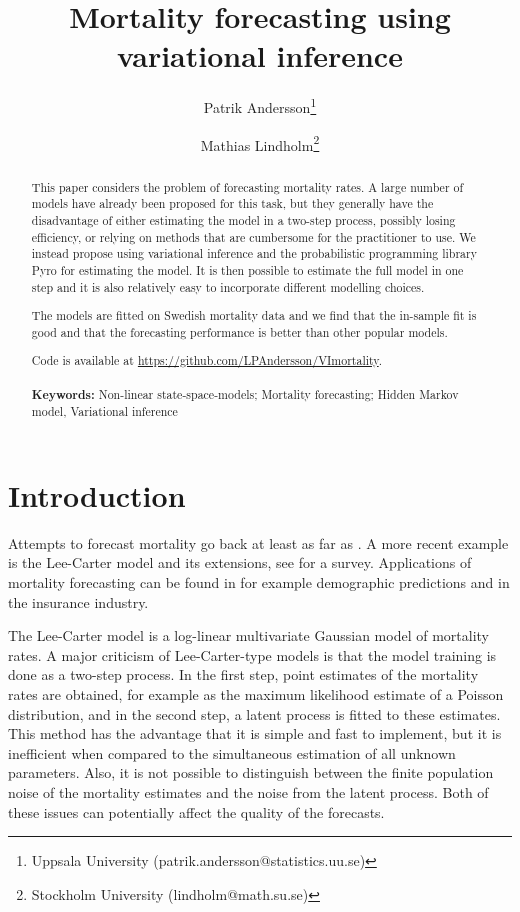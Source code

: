 \documentclass[11pt]{article}
\title{Mortality forecasting using variational inference}
\author{
Patrik Andersson\thanks{Uppsala University ({patrik.andersson@statistics.uu.se})}
\and  
Mathias Lindholm\thanks{Stockholm University ({lindholm@math.su.se})}
}
\date{}
\begin{document}
\maketitle

\begin{abstract}
This paper considers the problem of forecasting mortality rates. A large number of models have already been proposed for this task, but they generally have the disadvantage of either estimating the model in a two-step process, possibly losing efficiency, or relying on methods that are cumbersome for the practitioner to use. We instead propose using variational inference and the probabilistic programming library Pyro for estimating the model. It is then possible to estimate the full model in one step and it is also relatively easy to incorporate different modelling choices.

The models are fitted on Swedish mortality data and we find that the in-sample fit is good and that the forecasting performance is better than other popular models.

Code is available at \url{https://github.com/LPAndersson/VImortality}. \\\\
\textbf{Keywords:} Non-linear state-space-models; Mortality forecasting; Hidden Markov model, Variational inference
\end{abstract}

\section{Introduction}
Attempts to forecast mortality go back at least as far as \cite{gompertz1825nature}. A more recent example is the Lee-Carter model \citep{lee1992modeling} and its extensions, see \cite{booth2008mortality, haberman2011comparative, carfora2017quantitative} for a survey. Applications of mortality forecasting can be found in for example demographic predictions and in the insurance industry.

The Lee-Carter model is a log-linear multivariate Gaussian model of mortality rates. A major criticism of Lee-Carter-type models is that the model training is done as a two-step process. In the first step, point estimates of the mortality rates are obtained, for example as the maximum likelihood estimate of a Poisson distribution, and in the second step, a latent process is fitted to these estimates. This method has the advantage that it is simple and fast to implement, but it is inefficient when compared to the simultaneous estimation of all unknown parameters. Also, it is not possible to distinguish between the finite population noise of the mortality estimates and the noise from the latent process. Both of these issues can potentially affect the quality of the forecasts. 
\end{document}
